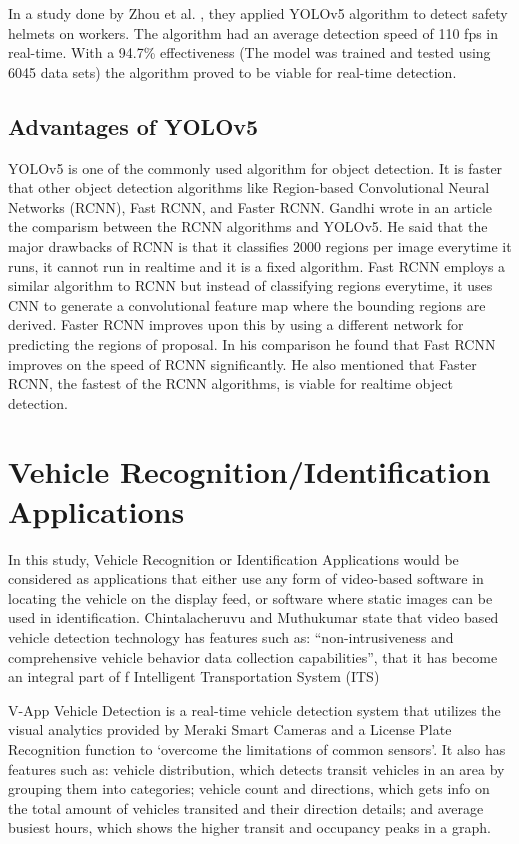 In a study done by Zhou et al. \citeyear{zhou_2021}, they applied YOLOv5 algorithm to detect safety helmets on workers. The algorithm had an average detection speed of 110 fps in real-time. With a 94.7\% effectiveness (The model was trained and tested  using 6045 data sets) the algorithm proved to be viable for real-time detection.

\subsection{Advantages of YOLOv5}
	YOLOv5 is one of the commonly used algorithm for object detection. It is faster that other object detection algorithms like Region-based Convolutional Neural Networks (RCNN), Fast RCNN, and Faster RCNN. Gandhi \citeyear{gandhi_2018} wrote in an article the comparism between the RCNN algorithms and YOLOv5. He said that the major drawbacks of RCNN is that it classifies 2000 regions per image everytime it runs, it cannot run in realtime and it is a fixed algorithm. Fast RCNN employs a similar algorithm to RCNN but instead of classifying regions everytime, it uses CNN to generate a convolutional feature map where the bounding regions are derived. Faster RCNN improves upon this by using a different network for predicting the regions of proposal. In his comparison he found that Fast RCNN improves on the speed of RCNN significantly. He also mentioned that Faster RCNN, the fastest of the RCNN algorithms, is viable for realtime object detection. 

\section{Vehicle Recognition/Identification Applications}
	
	In this study, Vehicle Recognition or Identification Applications would be considered as applications that either use any form of video-based software in locating the vehicle on the display feed, or software where static images can be used in identification. Chintalacheruvu and Muthukumar \citeyear{chintalacheruvu_2012} state that video based vehicle detection technology has features such as: “non-intrusiveness and comprehensive vehicle behavior data collection capabilities”, that it has become an integral part of f Intelligent Transportation System (ITS)

	V-App Vehicle Detection is a real-time vehicle detection system that utilizes the visual analytics provided by Meraki Smart Cameras and a License Plate Recognition function to ‘overcome the limitations of common sensors’. It also has features such as: vehicle distribution, which detects transit vehicles in an area by grouping them into categories; vehicle count and directions, which gets info on the total amount of vehicles transited and their direction details; and average busiest hours, which shows the higher transit and occupancy peaks in a graph. \cite{VAPP_ND}

